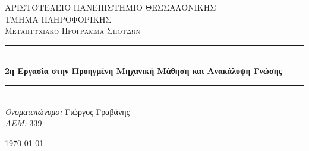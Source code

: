 \documentclass[a4paper,12pt]{article}
\begin{document}
	
	\begin{titlepage}
		
		\newcommand{\HRule}{\rule{\linewidth}{0.5mm}} %
		
		\center %
		
		
		\textsc{\LARGE ΑΡΙΣΤΟΤΕΛΕΙΟ ΠΑΝΕΠΙΣΤΗΜΙΟ ΘΕΣΣΑΛΟΝΙΚΗΣ}\\[1.5cm] %
		\textsc{\Large ΤΜΗΜΑ ΠΛΗΡΟΦΟΡΙΚΗΣ}\\[0.5cm] %
		\textsc{\large Μεταπτυχιακό Πρόγραμμα Σπουδών}\\[0.5cm] %
		

		\HRule \\[0.4cm]
		{ \huge \bfseries 2η Εργασία στην Προηγμένη Μηχανική Μάθηση και Ανακάλυψη Γνώσης}\\[0.4cm] %
		\HRule \\[1.5cm]
		
		
	
		\Large \emph{Ονοματεπώνυμο: } Γιώργος Γραβάνης\\
		\emph{ΑΕΜ: } 339
		
		
		{\large \today}\\[2cm] %
		
		

\end{titlepage}
\end{document}
